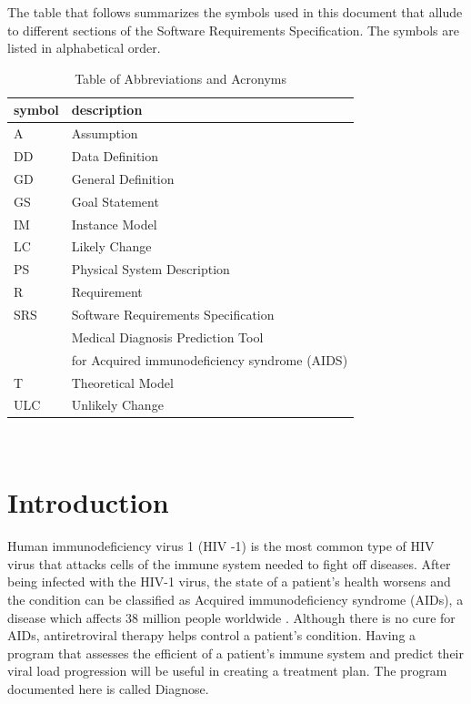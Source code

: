 \documentclass[12pt]{article}
\begin{document}
The table that follows summarizes the symbols used in this document that allude 
to different sections of the Software Requirements Specification. The symbols 
are listed in alphabetical order.
\begin{table}[h!]
\begin{center}
\renewcommand{\arraystretch}{1.2}
\begin{tabular}{l l} 
  \toprule		
  \textbf{symbol} & \textbf{description}\\
  \midrule 
  A & Assumption\\
  DD & Data Definition\\
  GD & General Definition\\
  GS & Goal Statement\\
  IM & Instance Model\\
  LC & Likely Change\\
  PS & Physical System Description\\
  R & Requirement\\
  SRS & Software Requirements Specification\\
  \progname{} & Medical Diagnosis Prediction Tool\\
  & for Acquired immunodeficiency syndrome (AIDS)\\
  T & Theoretical Model\\
  ULC & Unlikely Change\\
  \bottomrule
\end{tabular}\\
\end{center}
\caption{Table of Abbreviations and Acronyms}

\end{table}

\newpage



\section{Introduction}

Human immunodeficiency virus 1 (HIV -1) is the most common type of HIV virus 
that attacks cells of the immune system needed to fight off diseases. After 
being infected with the HIV-1 virus, the state of a patient's health worsens and 
the 
condition can be classified as Acquired immunodeficiency syndrome (AIDs), a 
disease which affects 38 million people worldwide \citep{who}. Although there is 
no cure for 
AIDs, antiretroviral 
therapy helps control a patient's condition. Having a program that assesses the 
efficient of a patient's immune system and predict their viral load progression 
will be 
useful in creating a treatment plan. The program documented here is called 
Diagnose.
\end{document}
